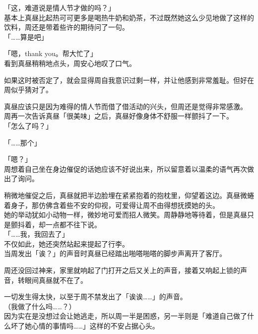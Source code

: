 「这，难道说是情人节才做的吗？」\\

基本上真昼比起热可可更多是喝热牛奶和奶茶，不过既然她这么少见地做了这样的饮料，周还是带着些许的期待问了一句。\\

「……算是吧」

「嗯，thank you。帮大忙了」\\

看到真昼稍稍地点头，周安心地叹了口气。

如果这时被否定了，就会显得周自我意识过剩一样，并让他感到非常羞耻。但好在周似乎猜对了。

真昼应该只是因为难得的情人节而借了借活动的兴头，但周还是觉得非常感激。\\

周再一次告诉真昼「很美味」之后，真昼好像身体不舒服一样颤抖了一下。\\

「怎么了吗？」

「……那个」

「嗯？」\\

周想着自己坐在身边催促的话她应该不好说出来，所以留意着以温柔的语气再次做出了询问。

稍微地催促之后，真昼就把半边脸埋在紧紧抱着的抱枕里，仰望着这边。真昼微蜷着身子，那仿佛含着些不安的仰视，可爱得让周不由得想抚摸她的头。\\

她的举动犹如小动物一样，微妙地可爱而招人微笑。周静静地等待着，但是真昼只是颤抖着，却一点都不往下说。\\

「……我，我回去了」\\

不仅如此，她还突然站起来提起了行李。\\

当周发出「诶？」的声音时真昼已经踏出啪嗒啪嗒的脚步声离开了客厅。

周还没回过神来，家里就响起了门打开之后又关上的声音，接着又响起上锁的声音，转眼间真昼就不在了。

一切发生得太快，以至于周不禁发出了「诶诶……」的声音。\\

（我做了什么吗……？）\\

因为实在是没想过会让她逃走，所以周一半是困惑，另一半则是「难道自己做了什么坏了她心情的事情吗……」这样的不安占据心头。\\

